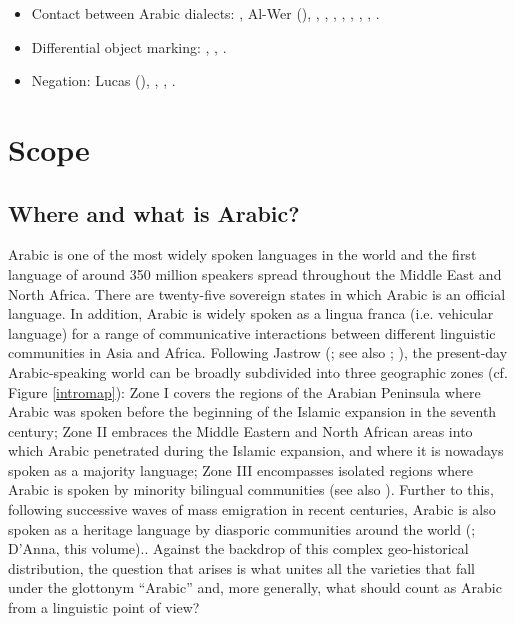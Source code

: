 \documentclass[output=paper]{langsci/langscibook}
\begin{document}
\begin{itemize}[noitemsep,leftmargin=11pt]
\item[\adfhalfrightarrowhead]Contact between Arabic dialects: \citet{Behnstedt1994Dialektkontakt}, Al-Wer (\citeyear{Al-Wer2002furtherreading,Al-Wer2007,Al-Wer2014}), \citet{Gibson2002}, \citet{Miller2007}, \citet{Al-Essa2009}, \citet{Palva2009}, \citet{Vicente2010}, \citet{Alghamdi2014}, \citet{CotterHoresh2015}, \citet{Leddy-Cecere2018}.

\item[\adfhalfrightarrowhead]Differential object marking: \citet{Coghill2014}, \citet{dohla2016}, \citet{Souag2017clitic}.

\item[\adfhalfrightarrowhead]Negation: Lucas (\citeyear{Lucas2007,Lucas2012,Lucas2013}), \citet{Souag2009}, \citet{LucasLash2010}, \citet{BreitbarthWillisLucasinpress}.

\end{itemize}

\section{Scope}\label{introscope}

\subsection{Where and what is Arabic?}\label{introwherewhat}

Arabic is one of the most widely spoken languages in the world and the first language of around 350 million speakers spread throughout the Middle East and North Africa. There are twenty-five sovereign states in which Arabic is an official language. In addition, Arabic is widely spoken as a lingua franca (i.e. vehicular language) for a range of communicative interactions between different linguistic communities in Asia and Africa. Following Jastrow (\citeyear{Jastrow2002}; see also \citealt{Watson2011dialectsoverview}; \citealt{Manfrediforthcoming}), the present-day Arabic-speaking world can be broadly subdivided into three geographic zones (cf. Figure \ref{intromap}): Zone I covers the regions of the Arabian Peninsula where Arabic was spoken before the beginning of the Islamic expansion in the seventh century; Zone II embraces the Middle Eastern and North African areas into which Arabic penetrated during the Islamic expansion, and where it is nowadays spoken as a majority language; Zone III encompasses isolated regions where Arabic is spoken by minority bilingual communities (see also \citealt{Owens2000editor}). Further to this, following successive waves of mass emigration in recent centuries, Arabic is also spoken as a heritage language by diasporic communities around the world (\citealt{Rouchdy_arabic_1992,BoumansdeRuiter2002}; D’Anna, this volume).. Against the backdrop of this complex geo-historical distribution, the question that arises is what unites all the varieties that fall under the glottonym ``Arabic'' and, more generally, what should count as Arabic from a linguistic point of view?
\end{document}
